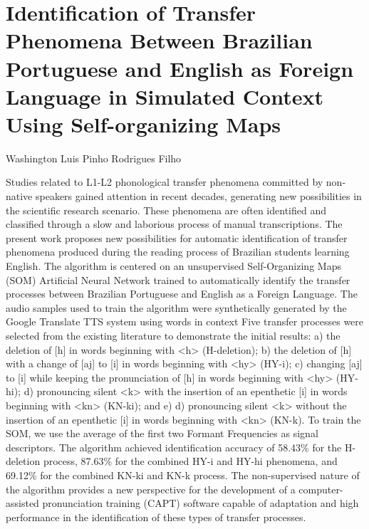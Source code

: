 \chapter{Identification of Transfer Phenomena Between Brazilian Portuguese and English as Foreign Language in Simulated Context Using Self-organizing Maps}\label{ch:washingtonlui19}
\chapterauthor[1]Washington Luis Pinho Rodrigues Filho{}
\begin{affils}
\end{affils}

Studies related to L1-L2 phonological transfer phenomena committed by non-native speakers gained attention in recent decades, generating new possibilities in the scientific research scenario. These phenomena are often identified and classified through a slow and laborious process of manual transcriptions. The present work proposes new possibilities for automatic identification of transfer phenomena produced during the reading process of Brazilian students learning English. The algorithm is centered on an unsupervised Self-Organizing Maps (SOM) Artificial Neural Network trained to automatically identify the transfer processes between Brazilian Portuguese and English as a Foreign Language. The audio samples used to train the algorithm were synthetically generated by the Google Translate TTS system using words in context  Five transfer processes were selected from the existing literature to demonstrate the initial results: a) the deletion of [h] in words beginning with <h> (H-deletion); b) the deletion of [h] with a change of [aj] to [i] in words beginning with <hy> (HY-i); c) changing [aj] to [i] while keeping the pronunciation of [h] in words beginning with <hy> (HY-hi); d) pronouncing silent <k> with the insertion of an epenthetic [i] in words beginning with <kn> (KN-ki); and e) d) pronouncing silent <k> without the insertion of an epenthetic [i] in words beginning with <kn> (KN-k).  To train the SOM, we use the average of the first two Formant Frequencies as signal descriptors.  The algorithm achieved identification accuracy of 58.43\% for the H-deletion process, 87.63\% for the combined HY-i and HY-hi phenomena, and 69.12\% for the combined KN-ki and KN-k process.  The non-supervised nature of the algorithm provides a new perspective for the development of a computer-assisted pronunciation training (CAPT) software capable of adaptation and high performance in the identification of these types of transfer processes.


